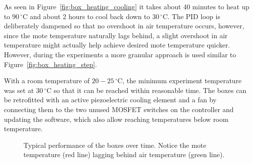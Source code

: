 As seen in Figure~\ref{fig:box_heating_cooling} it takes about 40 minutes to heat up to $90\,^{\circ}\mathrm{C}$ and about 2 hours to cool back down to $30\,^{\circ}\mathrm{C}$.
The PID loop is deliberately dampened so that no overshoot in air temperature occurs, however, since the mote temperature naturally lags behind, a slight overshoot in air temperature might actually help achieve desired mote temperature quicker.
However, during the experiments a more granular approach is used similar to Figure~\ref{fig:box_heating_step}.

With a room temperature of $20-25\,^{\circ}\mathrm{C}$, the minimum experiment temperature was set at $30\,^{\circ}\mathrm{C}$ so that it can be reached within reasonable time.
The boxes can be retrofitted with an active piezoelectric cooling element and a fan by connecting them to the two unused MOSFET switches on the controller and updating the software, which also allow reaching temperatures below room temperature.

\begin{figure}[H]
	\caption{Typical performance of the boxes over time. Notice the mote temperature (red line) lagging behind air temperature (green line).}
	\label{fig:box_heating_curves}
\end{figure}

